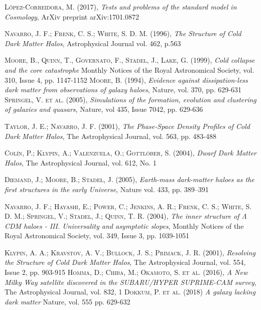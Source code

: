 \documentclass[a4paper,openright,10pt, oneside, final]{book}
\begin{document}
\begin{thebibliography}{a}

 \textsc{López-Correidora, M. (2017)},
\textit{Tests and problems of the standard model in Cosmology},
ArXiv preprint arXiv:1701.0872


 \textsc{Navarro, J. F.; Frenk, C. S.; White, S. D. M. (1996)},
\textit{The Structure of Cold Dark Matter Halos},
Astrophysical Journal vol. 462, p.563

 \textsc{Moore, B., Quinn, T., Governato, F., Stadel, J., Lake, G. (1999)},
\textit{Cold collapse and the core catastrophe}
Monthly Notices of the Royal Astronomical Society, vol. 310, Issue 4, pp. 1147-1152
 \textsc{Moore, B. (1994)},
\textit{Evidence against dissipation-less dark matter from observations of galaxy haloes},
Nature, vol. 370, pp. 629-631 
 \textsc{Springel, V. et al. (2005)},
\textit{Simulations of the formation, evolution and clustering of galaxies and quasars},
Nature, vol 435, Issue 7042, pp. 629-636

\textsc{Taylor, J. E.; Navarro, J. F. (2001)},
\textit{The Phase-Space Density Profiles of Cold Dark Matter Halos},
The Astrophysical Journal, vol. 563, pp. 483-488

\textsc{Colín, P.; Klypin, A.; Valenzuela, O.; Gottlöber, S. (2004)},
\textit{Dwarf Dark Matter Halos},
The Astrophysical Journal, vol. 612, No. 1

\textsc{Diemand, J.; Moore, B.; Stadel, J. (2005)},
\textit{Earth-mass dark-matter haloes as the first structures in the early Universe},
Nature vol. 433, pp. 389–391

 \textsc{Navarro, J. F.; Hayashi, E.; Power, C.; Jenkins, A. R.; Frenk, C. S.; White, S. D. M.; Springel, V.; Stadel, J.; Quinn, T. R. (2004)}, 
\textit{The inner structure of $\Lambda$CDM haloes - III. Universality and asymptotic slopes}, 
Monthly Notices of the Royal Astronomical Society, vol. 349, Issue 3, pp. 1039-1051

 \textsc{Klypin, A. A.; Kravstov, A. V.; Bullock, J. S.; Primack, J. R. (2001)},
\textit{Resolving the Structure of Cold Dark Matter Halos},
The Astrophysical Journal, vol. 554, Issue 2, pp. 903-915
 \textsc{Homma, D.; Chiba, M.; Okamoto, S. et al. (2016)},
\textit{A New Milky Way satellite discovered in the SUBARU/HYPER SUPRIME-CAM survey},
The Astrophysical Journal, vol. 832, 1
 \textsc{Dokkum, P. et al. (2018)}
\textit{A galaxy lacking dark matter}
Nature, vol. 555 pp. 629-632


\end{thebibliography}
\end{document}
